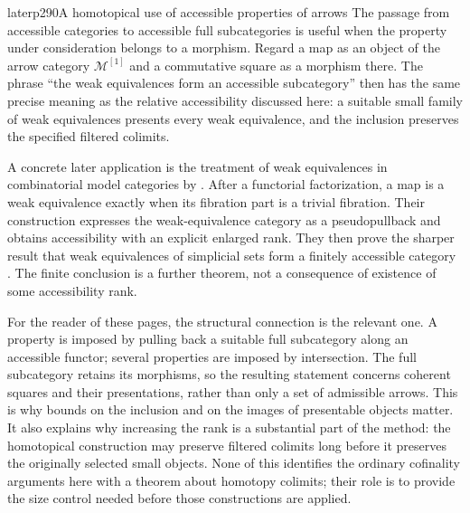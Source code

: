 \begin{dcomment}{later}{p290}{A homotopical use of accessible properties of arrows}
The passage from accessible categories to accessible full subcategories is useful when the property under consideration belongs to a morphism. Regard a map as an object of the arrow category $\mathcal M^{[1]}$ and a commutative square as a morphism there. The phrase ``the weak equivalences form an accessible subcategory'' then has the same precise meaning as the relative accessibility discussed here: a suitable small family of weak equivalences presents every weak equivalence, and the inclusion preserves the specified filtered colimits.

A concrete later application is the treatment of weak equivalences in combinatorial model categories by \citet[Section~2 and Proposition~2.2]{RaptisRosicky2015}. After a functorial factorization, a map is a weak equivalence exactly when its fibration part is a trivial fibration. Their construction expresses the weak-equivalence category as a pseudopullback and obtains accessibility with an explicit enlarged rank. They then prove the sharper result that weak equivalences of simplicial sets form a finitely accessible category \citep[Corollary~5.1]{RaptisRosicky2015}. The finite conclusion is a further theorem, not a consequence of existence of some accessibility rank.

For the reader of these pages, the structural connection is the relevant one. A property is imposed by pulling back a suitable full subcategory along an accessible functor; several properties are imposed by intersection. The full subcategory retains its morphisms, so the resulting statement concerns coherent squares and their presentations, rather than only a set of admissible arrows. This is why bounds on the inclusion and on the images of presentable objects matter. It also explains why increasing the rank is a substantial part of the method: the homotopical construction may preserve filtered colimits long before it preserves the originally selected small objects. None of this identifies the ordinary cofinality arguments here with a theorem about homotopy colimits; their role is to provide the size control needed before those constructions are applied.
\end{dcomment}

